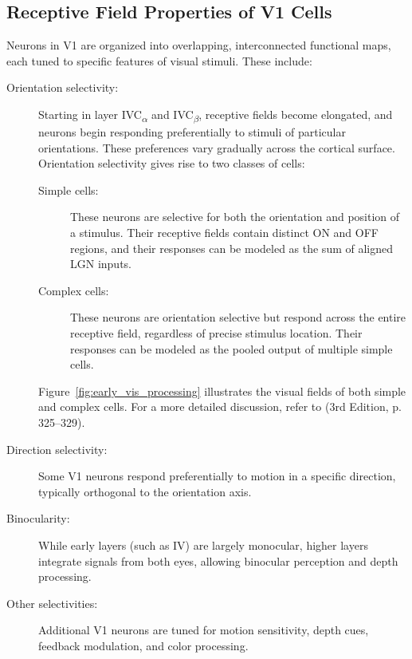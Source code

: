 \subsection{Receptive Field Properties of V1 Cells}
\label{subsec:receptive_field}

Neurons in V1 are organized into overlapping, interconnected functional maps, each tuned to specific features of visual stimuli. These include:

\begin{description}
    \item[Orientation selectivity:] Starting in layer IVC\textsubscript{\ensuremath{\alpha}} and IVC\textsubscript{\ensuremath{\beta}}, receptive fields become elongated, and neurons begin responding preferentially to stimuli of particular orientations. These preferences vary gradually across the cortical surface. Orientation selectivity gives rise to two classes of cells:
    \begin{description}
        \item[Simple cells:] These neurons are selective for both the orientation and position of a stimulus. Their receptive fields contain distinct ON and OFF regions, and their responses can be modeled as the sum of aligned LGN inputs.
        \item[Complex cells:] These neurons are orientation selective but respond across the entire receptive field, regardless of precise stimulus location. Their responses can be modeled as the pooled output of multiple simple cells.
    \end{description}
    Figure~\ref{fig:early_vis_processing} illustrates the visual fields of both simple and complex cells. For a more detailed discussion, refer to \citet{bear2020neuroscience} (3rd Edition, p. 325--329).

    \item[Direction selectivity:] Some V1 neurons respond preferentially to motion in a specific direction, typically orthogonal to the orientation axis.

    \item[Binocularity:] While early layers (such as IV) are largely monocular, higher layers integrate signals from both eyes, allowing binocular perception and depth processing.

    \item[Other selectivities:] Additional V1 neurons are tuned for motion sensitivity, depth cues, feedback modulation, and color processing.
\end{description}

